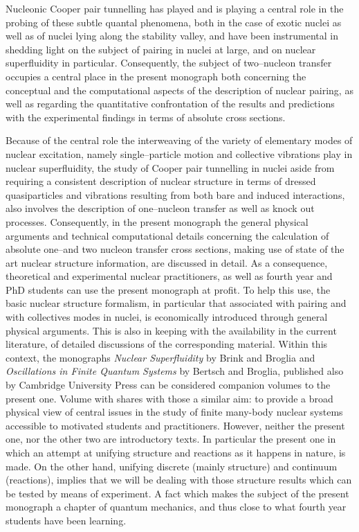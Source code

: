  Nucleonic Cooper pair tunnelling has played and is playing a central role in the probing of these subtle quantal phenomena, both in the case of  exotic nuclei as well as of nuclei lying along the stability valley, and have been instrumental in shedding light on the subject of pairing in nuclei at large, and on nuclear superfluidity in particular. Consequently, the subject of two--nucleon transfer occupies  a central place in the present monograph both concerning the conceptual and the computational aspects of the description of nuclear pairing, as well as regarding the quantitative confrontation of the results and predictions with the experimental findings in terms of absolute cross sections.

Because of the central role the interweaving of the variety of elementary modes of nuclear excitation, namely single--particle motion and collective vibrations play in nuclear superfluidity, the study of Cooper pair tunnelling in nuclei aside from requiring a consistent description of nuclear structure in terms of dressed quasiparticles and vibrations resulting from both bare and induced interactions, also involves  the description of one--nucleon transfer as well as knock out processes. Consequently, in the present monograph the general physical arguments and technical computational details concerning the   calculation of  absolute one--and two nucleon  transfer cross sections, making use of state of the art nuclear structure information, are discussed in detail. As a consequence, theoretical and experimental nuclear practitioners, as well as fourth year and PhD students can use the present monograph at profit. To help this use, the basic nuclear structure formalism, in particular that associated with pairing and with collectives modes in nuclei, is economically introduced through general physical arguments. This is also in keeping with the availability in the current literature, of detailed discussions of the corresponding material. Within this context, the monographs \emph{Nuclear Superfluidity} by Brink and Broglia and \emph{Oscillations in Finite Quantum Systems}  by Bertsch and Broglia, published also by Cambridge University Press can be considered companion volumes to the present one. Volume with shares with those a similar aim: to provide a broad physical view of central issues in the study of finite many-body nuclear systems accessible to motivated students and practitioners. However, neither the present one, nor the other two are introductory texts. In particular the present one in which an attempt at unifying structure and reactions as it happens in nature, is made. On the other hand, unifying discrete (mainly structure) and continuum (reactions), implies that we will be dealing with those structure results which can be tested by means of experiment. A fact which makes the subject of the present monograph a chapter of quantum mechanics, and thus close to what fourth year students have been learning.

